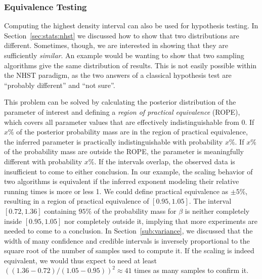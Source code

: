 \documentclass[algorithms,article,submit,moreauthors,pdftex]{Definitions/mdpi}
\newcommand{\changed}[1]{#1}
\begin{document}
\subsubsection{Equivalence Testing}
\label{sec:stats:equivalence}
Computing the highest density interval can also be used for hypothesis testing.
In Section~\ref{sec:stats:nhst} we discussed how to show that two distributions are different.
Sometimes, though, we are interested in showing that they are sufficiently \emph{similar}.
An example would be wanting to show that two sampling algorithms give the same distribution of results.
This is not easily possible within the NHST paradigm, as the two answers of a classical hypothesis test are ``probably different'' and ``not sure''.

This problem can be solved by calculating the posterior distribution of the parameter of interest and defining a \emph{region of practical equivalence} (ROPE), which covers all parameter values that are effectively indistinguishable from 0.
If $x\%$ of the posterior probability mass are in the region of practical equivalence, the inferred parameter is practically indistinguishable with probability $x\%$.
If $x\%$ of the probability mass are outside the ROPE, the parameter is meaningfully different with probability $x\%$.
If the intervals overlap, the observed data is insufficient to come to either conclusion.
In our example, the scaling behavior of two algorithms is equivalent if the inferred exponent modeling their relative running times is more or less 1.
We could define practical equivalence as $\pm 5\%$, resulting in a region of practical equivalence of $[0.95, 1.05]$.
The interval $[0.72, 1.36]$ containing $95\%$ of the probability mass for $\beta$ is neither completely inside $[0.95, 1.05]$ nor completely outside it, implying that more experiments are needed to come to a conclusion.
\changed{In Section~\ref{sub:variance}, we discussed that the width of many confidence and credible intervals is inversely proportional to the square root of the number of samples used to compute it.
If the scaling is indeed equivalent, we would thus expect to need at least $((1.36-0.72)/(1.05-0.95))^2 \approx 41$ times as many samples to confirm it.}
\end{document}
